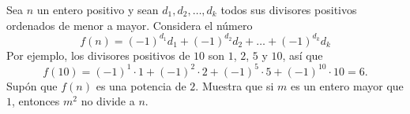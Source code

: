 Sea $n$ un entero positivo y sean $d_1, d_2, \dots , d_k$ todos sus divisores positivos ordenados de
menor a mayor. Considera el número
\[f (n) = (-1)^{d_1} d_1 + (-1)^{d_2} d_2 + \dots + (-1)^{d_k} d_k\]
Por ejemplo, los divisores positivos de $10$ son $1$, $2$, $5$ y $10$, así que
\[f (10) = (-1)^1 \cdot 1 + (-1)^2 \cdot 2 + (-1)^5 \cdot 5 + (-1)^{10} \cdot 10 = 6.\]
Supón que $f (n)$ es una potencia de $2$. Muestra que si $m$ es un entero mayor que $1$, entonces
$m^2$ no divide a $n$.